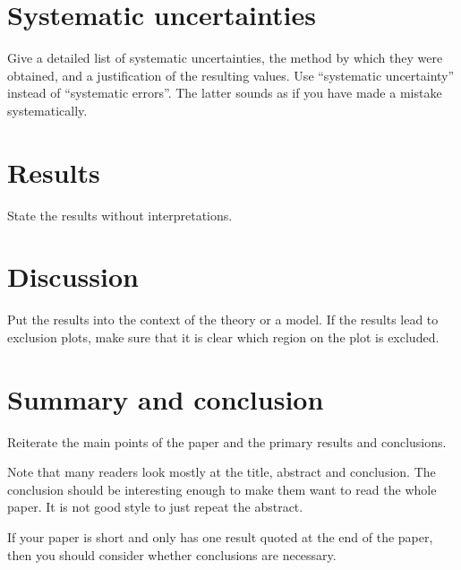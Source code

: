\documentclass[coverpage]{style/atlasdoc}
\begin{document}
\section{Systematic uncertainties}
\label{sec:syst}

Give a detailed list of systematic uncertainties, the method
by which they were obtained, and a justification of the resulting
values.
%
Use ``systematic uncertainty'' instead of ``systematic errors''.
The latter sounds as if you have made a mistake systematically.


\section{Results}
\label{sec:result}

State the results without interpretations.


\section{Discussion}
\label{sec:discussion}

Put the results into the context of the theory or a model.
%
If the results lead to exclusion plots, make sure that it is clear 
which region on the plot is excluded.


\section{Summary and conclusion}
\label{sec:summary}

Reiterate the main points of the paper and the primary results and
conclusions.

Note that many readers look mostly at the title, abstract and
conclusion. The conclusion should be interesting enough to
make them want to read the whole paper.
It is not good style to just repeat the abstract.

If your paper is short and only has one result quoted at the end of
the paper, then you should consider whether conclusions are
necessary. 
\end{document}
